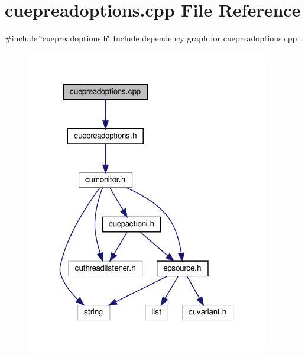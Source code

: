 \section{cuepreadoptions.\+cpp File Reference}
\label{cuepreadoptions_8cpp}
{\ttfamily \#include \char`\"{}cuepreadoptions.\+h\char`\"{}}\newline
Include dependency graph for cuepreadoptions.\+cpp\+:\nopagebreak
\begin{figure}[H]
\begin{center}
\leavevmode
\includegraphics[width=301pt]{cuepreadoptions_8cpp__incl}
\end{center}
\end{figure}
